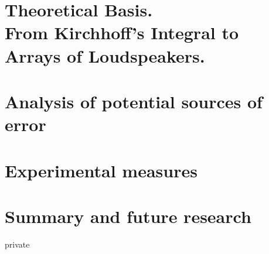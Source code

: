 \documentclass[11pt,a4paper,notitlepage]{report}
\begin{document}
\chapter[Theoretical Basis]{Theoretical Basis.\\From Kirchhoff's Integral to Arrays of Loudspeakers.}\label{chapterWFStheory}

%
%

%

\chapter{Analysis of potential sources of error}
%


\chapter{Experimental measures}


\chapter{Summary and future research}


\begin{shownto}{private}
\begin{appendices}
%
%
%
%
%
%
%
%

%
\end{appendices}
\end{shownto}
	
%	

\end{document}
